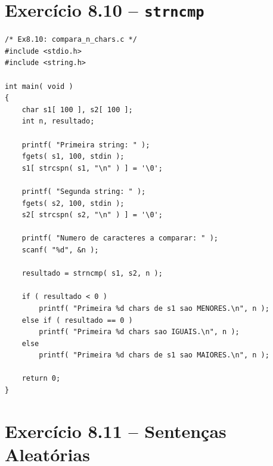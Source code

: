 \documentclass[12pt,a4paper]{article}
\begin{document}
\section{Exercício 8.10 -- \texttt{strncmp}}

\begin{respostabox}
\begin{lstlisting}
/* Ex8.10: compara_n_chars.c */
#include <stdio.h>
#include <string.h>

int main( void )
{
    char s1[ 100 ], s2[ 100 ];
    int n, resultado;

    printf( "Primeira string: " );
    fgets( s1, 100, stdin );
    s1[ strcspn( s1, "\n" ) ] = '\0';

    printf( "Segunda string: " );
    fgets( s2, 100, stdin );
    s2[ strcspn( s2, "\n" ) ] = '\0';

    printf( "Numero de caracteres a comparar: " );
    scanf( "%d", &n );

    resultado = strncmp( s1, s2, n );

    if ( resultado < 0 )
        printf( "Primeira %d chars de s1 sao MENORES.\n", n );
    else if ( resultado == 0 )
        printf( "Primeira %d chars sao IGUAIS.\n", n );
    else
        printf( "Primeira %d chars de s1 sao MAIORES.\n", n );

    return 0;
}
\end{lstlisting}
\end{respostabox}

\newpage

\section{Exercício 8.11 -- Sentenças Aleatórias}
\end{document}
